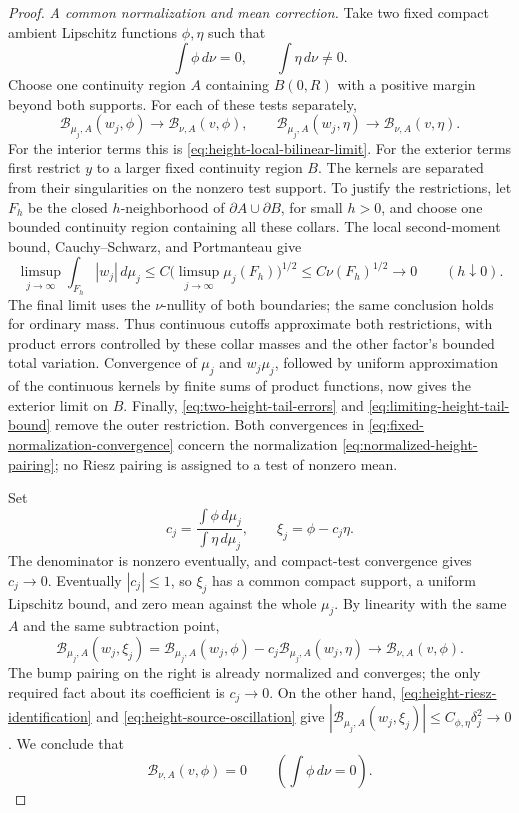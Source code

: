 \begin{proof}
\emph{A common normalization and mean correction.}
Take two fixed compact ambient Lipschitz functions $\phi,\eta$ such that
\[
 \int\phi\,d\nu=0,\qquad \int\eta\,d\nu\ne0.
\]
Choose one continuity region $A$ containing $B(0,R)$ with a positive
margin beyond both supports.  For each of these tests separately,
\begin{equation}\label{eq:fixed-normalization-convergence}
 \mathcal B_{\mu_j,A}(w_j,\phi)
       \longrightarrow\mathcal B_{\nu,A}(v,\phi),
 \qquad
 \mathcal B_{\mu_j,A}(w_j,\eta)
       \longrightarrow\mathcal B_{\nu,A}(v,\eta).
\end{equation}
For the interior terms this is
\eqref{eq:height-local-bilinear-limit}.  For the exterior terms first
restrict $y$ to a larger fixed continuity region $B$.  The kernels are
separated from their singularities on the nonzero test support.  To justify
the restrictions, let $F_h$ be the closed $h$-neighborhood of
$\partial A\cup\partial B$, for small $h>0$, and choose one bounded
continuity region containing all these collars.  The local second-moment
bound, Cauchy--Schwarz, and Portmanteau give
\[
 \limsup_{j\to\infty}\int_{F_h}|w_j|\,d\mu_j
 \le C\bigl(\limsup_{j\to\infty}\mu_j(F_h)\bigr)^{1/2}
 \le C\nu(F_h)^{1/2}\longrightarrow0
 \qquad(h\downarrow0).
\]
The final limit uses the $\nu$-nullity of both boundaries; the same
conclusion holds for ordinary mass.  Thus continuous cutoffs approximate
both restrictions, with product errors controlled by these collar masses
and the other factor's bounded total variation.  Convergence of $\mu_j$
and $w_j\mu_j$, followed by uniform approximation of the continuous
kernels by finite sums of product functions, now gives the exterior
limit on $B$.  Finally,
\eqref{eq:two-height-tail-errors} and
\eqref{eq:limiting-height-tail-bound} remove the outer restriction.
Both convergences in \eqref{eq:fixed-normalization-convergence} concern
the normalization \eqref{eq:normalized-height-pairing}; no Riesz pairing
is assigned to a test of nonzero mean.

Set
\[
 c_j=\frac{\int\phi\,d\mu_j}{\int\eta\,d\mu_j},
       \qquad \xi_j=\phi-c_j\eta.
\]
The denominator is nonzero eventually, and compact-test convergence gives
$c_j\to0$.  Eventually $|c_j|\le1$, so $\xi_j$ has a common compact
support, a uniform Lipschitz bound, and zero mean against the whole
$\mu_j$.  By linearity with the same $A$ and the same subtraction point,
\[
 \mathcal B_{\mu_j,A}(w_j,\xi_j)
       =\mathcal B_{\mu_j,A}(w_j,\phi)
        -c_j\mathcal B_{\mu_j,A}(w_j,\eta)
       \longrightarrow\mathcal B_{\nu,A}(v,\phi).
\]
The bump pairing on the right is already normalized and converges; the
only required fact about its coefficient is $c_j\to0$.
On the other hand, \eqref{eq:height-riesz-identification} and
\eqref{eq:height-source-oscillation} give
$|\mathcal B_{\mu_j,A}(w_j,\xi_j)|\le C_{\phi,\eta}\delta_j^2\to0$.
We conclude that
\begin{equation}\label{eq:compact-renormalized-height-equation}
 \mathcal B_{\nu,A}(v,\phi)=0
 \qquad\left(\int\phi\,d\nu=0\right).
\end{equation}


\end{proof}

